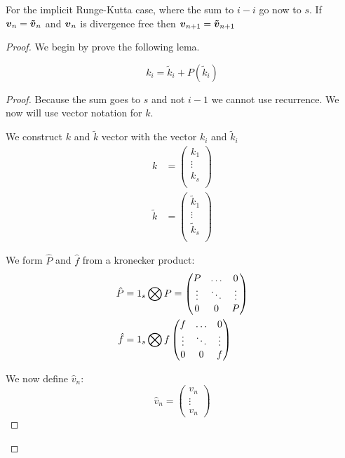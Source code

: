  \begin{thm}
 For the implicit Runge-Kutta case, where the sum to $i-i$ go now to $s$.
If ${\boldsymbol {v}}_{n}={\boldsymbol {\tilde{v}}}_{n}$ and ${\boldsymbol {v}}_n$ is divergence free then ${\boldsymbol {v}}_{n+1}={\boldsymbol {\tilde{v}}}_{n+1}$ 
\end{thm}
 \begin{proof}
 We begin by prove the following lema.
 \begin{lem}
 \begin{equation}
  k_{i}=\tilde{k}_{i}+P(\tilde{k}_{i})
 \end{equation}
 \end{lem}
 \begin{proof}
Because the sum goes to $s$ and not $i-1$ we cannot use recurrence.
We now will use vector notation for $k$.

We construct $k$ and $\tilde{k}$ vector with the vector $k_{i}$ and $\tilde{k}_{i}$
\begin{align}
 k&=\begin{pmatrix}
    k_{1}\\
    \vdots\\
    k_{s}\\
   \end{pmatrix}\\
 \tilde{k}&=\begin{pmatrix}
    \tilde{k}_{1}\\
    \vdots\\
    \tilde{k}_{s}\\
   \end{pmatrix}
\end{align}

We form $\hat{P}$ and $\hat{f}$ from a kronecker product:
\begin{align}
 \hat{P}&=1_{s}\bigotimes P=\begin{pmatrix}P	&\ldots	&0\\
			\vdots &\ddots 	&\vdots\\
			0	&0	&P\\
         \end{pmatrix}\\
 \hat{f}&=1_{s}\bigotimes f\begin{pmatrix}f	&\ldots	&0\\
			\vdots &\ddots 	&\vdots\\
			0	&0	&f\\
         \end{pmatrix}
\end{align}

We now define $\hat{v}_n$:
\begin{equation}
 \hat{v}_{n}=\begin{pmatrix}
               v_{n}\\
               \vdots\\
               v_{n}
              \end{pmatrix}
\end{equation}


\end{proof}
\end{proof}
